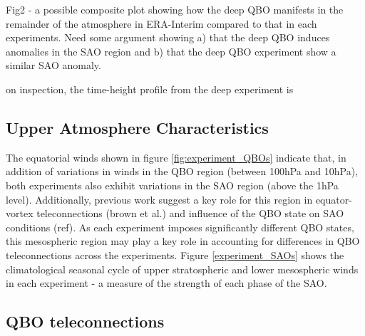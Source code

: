 Fig2 - a possible composite plot showing how the deep QBO manifests in the remainder of the atmosphere in ERA-Interim compared to that in each experiments. Need some argument showing a) that the deep QBO induces anomalies in the SAO region and b) that the deep QBO experiment show a similar SAO anomaly. 

on inspection, the time-height profile from the deep experiment is 

\subsection{Upper Atmosphere Characteristics}

The equatorial winds shown in figure \ref{fig:experiment_QBOs} indicate that, in addition of variations in winds in the QBO region (between 100hPa and 10hPa), both experiments also exhibit variations in the SAO region (above the 1hPa level). Additionally, previous work suggest a key role for this region in equator-vortex teleconnections (brown et al.) and influence of the QBO state on SAO conditions (ref). As each experiment imposes significantly different QBO states, this mesospheric region may play a key role in accounting for differences in QBO teleconnections across the experiments. Figure \ref{experiment_SAOs} shows the climatological seasonal cycle of upper stratospheric and lower mesospheric winds in each experiment - a measure of the strength of each phase of the SAO. 


\subsection{QBO teleconnections}



